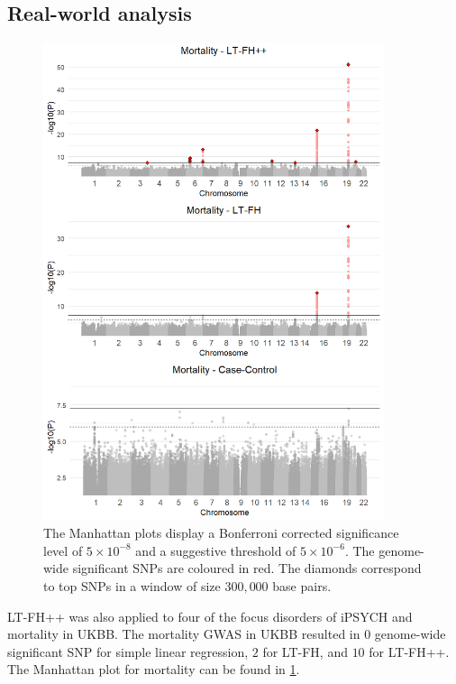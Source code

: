 \newpage

\subsection{Real-world analysis}
\begin{figure}
	\includegraphics[width=10cm]{results/manhattanPlot_mortality.png}
	\caption[Manhattan plots for LT-FH++, LT-FH, and case-control GWAS of mortality	in the UK Biobank]{The Manhattan plots display a Bonferroni corrected significance level of $ 5\times 10^{-8} $ and a suggestive threshold of $ 5\times 10^{-6} $. The genome-wide significant SNPs are coloured in red. The diamonds correspond to top	SNPs in a window of size $ 300,000 $ base pairs.}
	\label{fig:LTFH++_manhattanMortality}
\end{figure}
LT-FH++ was also applied to four of the focus disorders of iPSYCH and mortality in UKBB. The mortality GWAS in UKBB resulted in $ 0 $ genome-wide significant SNP for simple linear regression, $ 2 $ for LT-FH, and $ 10 $ for LT-FH++. The Manhattan plot for mortality can be found in \cref{fig:LTFH++_manhattanMortality}.

